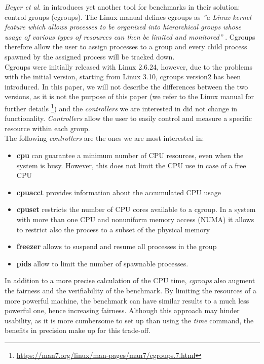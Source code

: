 \textit{Beyer et al.} in \cite{Beyer2017ReliableBR} introduces yet another tool for benchmarks in their solution: control groups (cgroups). The Linux manual defines cgroups as \textit{''a Linux kernel feature which allows processes to be organized into hierarchical groups whose usage of various types of resources can then be limited and monitored''} \cite{LinuxManualWeb}. Cgroups therefore allow the user to assign processes to a group and every child process spawned by the assigned process will be tracked down. \\
Cgroups were initially released with Linux 2.6.24, however, due to the problems with the initial version, starting from Linux 3.10, cgroups version2 has been introduced. In this paper, we will not describe the differences between the two versions, as it is not the purpose of this paper (we refer to the Linux manual for further details \footnote{ \url{https://man7.org/linux/man-pages/man7/cgroups.7.html}}) and the \textit{controllers} we are interested in did not change in functionality.  \textit{Controllers} allow the user to easily control and measure a specific resource within each group. \cite{Beyer2017ReliableBR}\\
The following \textit{controllers} are the ones we are most interested in:
\begin{itemize}
    \item[] \textbf{cpu} \quad    can guarantee a minimum number of CPU resources, even when the system is busy. However, this does not limit the CPU use in case of a free CPU
    \item[] \textbf{cpuacct} \quad provides information about the accumulated CPU usage
    \item[] \textbf{cpuset} \quad restricts the number of CPU cores available to a cgroup. In a system with more than one CPU and nonuniform memory access (NUMA) it allows to restrict also the process to a subset of the physical memory  \cite{Beyer2017ReliableBR}
    \item[] \textbf{freezer} \quad allows to suspend and resume all processes in the group
    \item[] \textbf{pids} \quad allow to limit the number of spawnable processes. 
\end{itemize}
In addition to a more precise calculation of the CPU time, \textit{cgroups} also augment the fairness and the verifiability of the benchmark. By limiting the resources of a more powerful machine, the benchmark can have similar results to a much less powerful one, hence increasing fairness. 
Although this approach may hinder usability, as it is more cumbersome to set up than using the \textit{time} command, the benefits in precision make up for this trade-off. 
